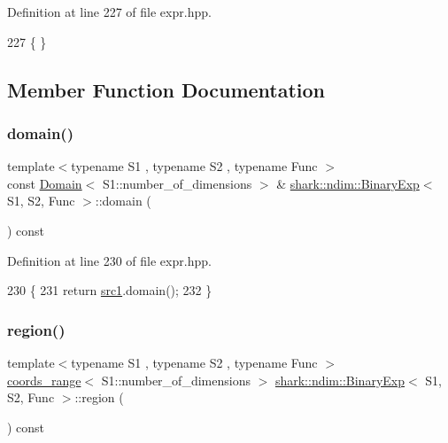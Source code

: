 Definition at line 227 of file expr.\+hpp.


\begin{DoxyCode}
227 \{ \}
\end{DoxyCode}


\subsection{Member Function Documentation}
\hypertarget{classshark_1_1ndim_1_1_binary_exp_a127cbe45d16879c4f83361c7d045ba12}{}\label{classshark_1_1ndim_1_1_binary_exp_a127cbe45d16879c4f83361c7d045ba12} 
\subsubsection{\texorpdfstring{domain()}{domain()}}
{\footnotesize\ttfamily template$<$typename S1 , typename S2 , typename Func $>$ \\
const \hyperlink{classshark_1_1ndim_1_1_domain}{Domain}$<$ S1\+::number\+\_\+of\+\_\+dimensions $>$ \& \hyperlink{classshark_1_1ndim_1_1_binary_exp}{shark\+::ndim\+::\+Binary\+Exp}$<$ S1, S2, Func $>$\+::domain (\begin{DoxyParamCaption}{ }\end{DoxyParamCaption}) const\hspace{0.3cm}{\ttfamily [inline]}}



Definition at line 230 of file expr.\+hpp.


\begin{DoxyCode}
230                                                                                          \{
231             \textcolor{keywordflow}{return} \hyperlink{classshark_1_1ndim_1_1_binary_exp_adca0646eb1ee123dc4312644a39ffdb6}{src1}.domain();
232         \}
\end{DoxyCode}
\hypertarget{classshark_1_1ndim_1_1_binary_exp_a21f5512d10d29011d7ec82585cea5022}{}\label{classshark_1_1ndim_1_1_binary_exp_a21f5512d10d29011d7ec82585cea5022} 
\subsubsection{\texorpdfstring{region()}{region()}}
{\footnotesize\ttfamily template$<$typename S1 , typename S2 , typename Func $>$ \\
\hyperlink{structshark_1_1ndim_1_1coords__range}{coords\+\_\+range}$<$ S1\+::number\+\_\+of\+\_\+dimensions $>$ \hyperlink{classshark_1_1ndim_1_1_binary_exp}{shark\+::ndim\+::\+Binary\+Exp}$<$ S1, S2, Func $>$\+::region (\begin{DoxyParamCaption}{ }\end{DoxyParamCaption}) const\hspace{0.3cm}{\ttfamily [inline]}}



